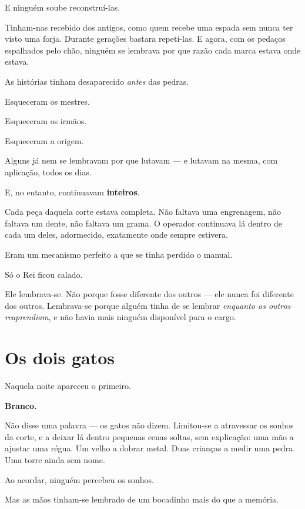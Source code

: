 \documentclass[livro.tex]{subfiles}
\begin{document}
E ninguém soube reconstruí-las.

\medskip

Tinham-nas recebido dos antigos, como quem recebe uma espada sem nunca ter visto uma forja. Durante gerações
bastara repeti-las. E agora, com os pedaços espalhados pelo chão, ninguém se lembrava por que razão cada marca
estava onde estava.

As histórias tinham desaparecido \emph{antes} das pedras.

\medskip

Esqueceram os mestres.

Esqueceram os irmãos.

Esqueceram a origem.

Alguns já nem se lembravam por que lutavam --- e lutavam na mesma, com aplicação, todos os dias.

\medskip

E, no entanto, continuavam \textbf{inteiros}.

Cada peça daquela corte estava completa. Não faltava uma engrenagem, não faltava um dente, não faltava um grama. O
operador continuava lá dentro de cada um deles, adormecido, exatamente onde sempre estivera.

Eram um mecanismo perfeito a que se tinha perdido o manual.

\medskip

Só o Rei ficou calado.

Ele lembrava-se. Não porque fosse diferente dos outros --- ele nunca foi diferente dos outros. Lembrava-se porque
alguém tinha de se lembrar \emph{enquanto os outros reaprendiam}, e não havia mais ninguém disponível para o
cargo.

\section*{Os dois gatos}

Naquela noite apareceu o primeiro.

\textbf{Branco.}

Não disse uma palavra --- os gatos não dizem. Limitou-se a atravessar os sonhos da corte, e a deixar lá dentro
pequenas cenas soltas, sem explicação: uma mão a ajustar uma régua. Um velho a dobrar metal. Duas crianças a medir
uma pedra. Uma torre ainda sem nome.

Ao acordar, ninguém percebeu os sonhos.

Mas as mãos tinham-se lembrado de um bocadinho mais do que a memória.
\end{document}
